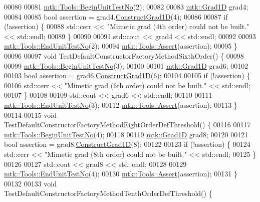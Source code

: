 \begin{DoxyCode}
00080 
00081   \hyperlink{classmtk_1_1Tools_afc29ecaf337a13ed2e817d3890a5a441}{mtk::Tools::BeginUnitTestNo}(2);
00082 
00083   \hyperlink{classmtk_1_1Grad1D}{mtk::Grad1D} grad4;
00084 
00085   \textcolor{keywordtype}{bool} assertion = grad4.\hyperlink{classmtk_1_1Grad1D_a74ef5245cfae6fd158bd7f563a0c2e52}{ConstructGrad1D}(4);
00086 
00087   \textcolor{keywordflow}{if} (!assertion) \{
00088     std::cerr << \textcolor{stringliteral}{"Mimetic grad (4th order) could not be built."} << std::endl;
00089   \}
00090 
00091   std::cout << grad4 << std::endl;
00092 
00093   \hyperlink{classmtk_1_1Tools_aba67d9dc35c9c1c49430fcc9ea035e03}{mtk::Tools::EndUnitTestNo}(2);
00094   \hyperlink{classmtk_1_1Tools_ac6804df469c94ab6a796fb64f1e44a89}{mtk::Tools::Assert}(assertion);
00095 \}
00096 
00097 \textcolor{keywordtype}{void} TestDefaultConstructorFactoryMethodSixthOrder() \{
00098 
00099   \hyperlink{classmtk_1_1Tools_afc29ecaf337a13ed2e817d3890a5a441}{mtk::Tools::BeginUnitTestNo}(3);
00100 
00101   \hyperlink{classmtk_1_1Grad1D}{mtk::Grad1D} grad6;
00102 
00103   \textcolor{keywordtype}{bool} assertion = grad6.\hyperlink{classmtk_1_1Grad1D_a74ef5245cfae6fd158bd7f563a0c2e52}{ConstructGrad1D}(6);
00104 
00105   \textcolor{keywordflow}{if} (!assertion) \{
00106     std::cerr << \textcolor{stringliteral}{"Mimetic grad (6th order) could not be built."} << std::endl;
00107   \}
00108 
00109   std::cout << grad6 << std::endl;
00110 
00111   \hyperlink{classmtk_1_1Tools_aba67d9dc35c9c1c49430fcc9ea035e03}{mtk::Tools::EndUnitTestNo}(3);
00112   \hyperlink{classmtk_1_1Tools_ac6804df469c94ab6a796fb64f1e44a89}{mtk::Tools::Assert}(assertion);
00113 \}
00114 
00115 \textcolor{keywordtype}{void} TestDefaultConstructorFactoryMethodEightOrderDefThreshold() \{
00116 
00117   \hyperlink{classmtk_1_1Tools_afc29ecaf337a13ed2e817d3890a5a441}{mtk::Tools::BeginUnitTestNo}(4);
00118 
00119   \hyperlink{classmtk_1_1Grad1D}{mtk::Grad1D} grad8;
00120 
00121   \textcolor{keywordtype}{bool} assertion = grad8.\hyperlink{classmtk_1_1Grad1D_a74ef5245cfae6fd158bd7f563a0c2e52}{ConstructGrad1D}(8);
00122 
00123   \textcolor{keywordflow}{if} (!assertion) \{
00124     std::cerr << \textcolor{stringliteral}{"Mimetic grad (8th order) could not be built."} << std::endl;
00125   \}
00126 
00127   std::cout << grad8 << std::endl;
00128 
00129   \hyperlink{classmtk_1_1Tools_aba67d9dc35c9c1c49430fcc9ea035e03}{mtk::Tools::EndUnitTestNo}(4);
00130   \hyperlink{classmtk_1_1Tools_ac6804df469c94ab6a796fb64f1e44a89}{mtk::Tools::Assert}(assertion);
00131 \}
00132 
00133 \textcolor{keywordtype}{void} TestDefaultConstructorFactoryMethodTenthOrderDefThreshold() \{

\end{DoxyCode}
